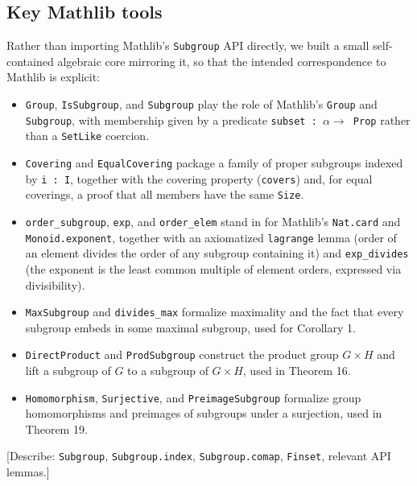 \documentclass[12pt, a4paper]{article}
\theoremstyle{plain}
\theoremstyle{definition}
\begin{document}
\subsection{Key Mathlib tools}
Rather than importing Mathlib's \texttt{Subgroup} API directly, we built a
small self-contained algebraic core mirroring it, so that the intended
correspondence to Mathlib is explicit:
\begin{itemize}
  \item \texttt{Group}, \texttt{IsSubgroup}, and \texttt{Subgroup} play the
    role of Mathlib's \texttt{Group} and \texttt{Subgroup}, with membership
    given by a predicate \texttt{subset : $\alpha \to$ Prop} rather than a
    \texttt{SetLike} coercion.
  \item \texttt{Covering} and \texttt{EqualCovering} package a family of
    proper subgroups indexed by \texttt{i : I}, together with the covering
    property (\texttt{covers}) and, for equal coverings, a proof that all
    members have the same \texttt{Size}.
  \item \texttt{order\_subgroup}, \texttt{exp}, and \texttt{order\_elem}
    stand in for Mathlib's \texttt{Nat.card} and
    \texttt{Monoid.exponent}, together with an axiomatized
    \texttt{lagrange} lemma (order of an element divides the order of any
    subgroup containing it) and \texttt{exp\_divides} (the exponent is the
    least common multiple of element orders, expressed via divisibility).
  \item \texttt{MaxSubgroup} and \texttt{divides\_max} formalize maximality
    and the fact that every subgroup embeds in some maximal subgroup, used
    for Corollary 1.
  \item \texttt{DirectProduct} and \texttt{ProdSubgroup} construct the
    product group $G \times H$ and lift a subgroup of $G$ to a subgroup of
    $G \times H$, used in Theorem 16.
  \item \texttt{Homomorphism}, \texttt{Surjective}, and
    \texttt{PreimageSubgroup} formalize group homomorphisms and preimages of
    subgroups under a surjection, used in Theorem 19.
\end{itemize}

[Describe: \texttt{Subgroup}, \texttt{Subgroup.index}, \texttt{Subgroup.comap},
\texttt{Finset}, relevant API lemmas.]
\end{document}
